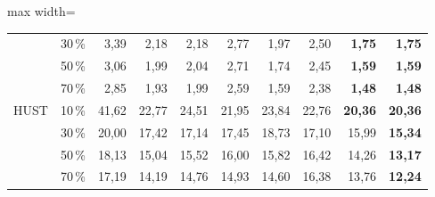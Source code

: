 \documentclass[12pt,a4paper,oneside]{report}
\theoremstyle{plain}
\theoremstyle{definition}
\begin{document}
\begin{table}[!htbp]
\begin{adjustbox}{max width=\textwidth}
\begin{tabular}{llrrrrrrrr}
 & 30\,\% & 3{,}39 & 2{,}18 & 2{,}18 & 2{,}77 & 1{,}97 & 2{,}50 & \textbf{1{,}75} & \textbf{1{,}75} \\
 & 50\,\% & 3{,}06 & 1{,}99 & 2{,}04 & 2{,}71 & 1{,}74 & 2{,}45 & \textbf{1{,}59} & \textbf{1{,}59} \\
 & 70\,\% & 2{,}85 & 1{,}93 & 1{,}99 & 2{,}59 & 1{,}59 & 2{,}38 & \textbf{1{,}48} & \textbf{1{,}48} \\
HUST & 10\,\% & 41{,}62 & 22{,}77 & 24{,}51 & 21{,}95 & 23{,}84 & 22{,}76 & \textbf{20{,}36} & \textbf{20{,}36} \\
 & 30\,\% & 20{,}00 & 17{,}42 & 17{,}14 & 17{,}45 & 18{,}73 & 17{,}10 & 15{,}99 & \textbf{15{,}34} \\
 & 50\,\% & 18{,}13 & 15{,}04 & 15{,}52 & 16{,}00 & 15{,}82 & 16{,}42 & 14{,}26 & \textbf{13{,}17} \\
 & 70\,\% & 17{,}19 & 14{,}19 & 14{,}76 & 14{,}93 & 14{,}60 & 16{,}38 & 13{,}76 & \textbf{12{,}24} \\
\bottomrule\end{tabular}\end{adjustbox}\end{table}
\end{document}
